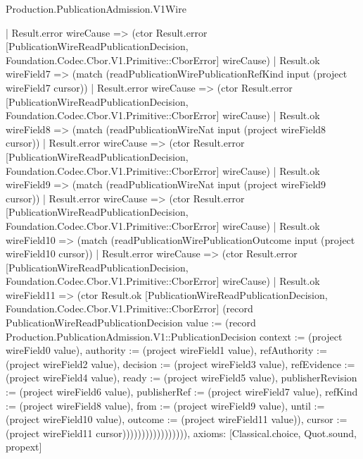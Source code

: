 \begin{lexlean}{Production.PublicationAdmission.V1Wire}
\begin{semanticmodule}
{                      | Result.error wireCause => (ctor Result.error [PublicationWireReadPublicationDecision, Foundation.Codec.Cbor.V1.Primitive::CborError] wireCause)
                      | Result.ok wireField7 => (match (readPublicationWirePublicationRefKind input (project wireField7 cursor))
                        | Result.error wireCause => (ctor Result.error [PublicationWireReadPublicationDecision, Foundation.Codec.Cbor.V1.Primitive::CborError] wireCause)
                        | Result.ok wireField8 => (match (readPublicationWireNat input (project wireField8 cursor))
                          | Result.error wireCause => (ctor Result.error [PublicationWireReadPublicationDecision, Foundation.Codec.Cbor.V1.Primitive::CborError] wireCause)
                          | Result.ok wireField9 => (match (readPublicationWireNat input (project wireField9 cursor))
                            | Result.error wireCause => (ctor Result.error [PublicationWireReadPublicationDecision, Foundation.Codec.Cbor.V1.Primitive::CborError] wireCause)
                            | Result.ok wireField10 => (match (readPublicationWirePublicationOutcome input (project wireField10 cursor))
                              | Result.error wireCause => (ctor Result.error [PublicationWireReadPublicationDecision, Foundation.Codec.Cbor.V1.Primitive::CborError] wireCause)
                              | Result.ok wireField11 => (ctor Result.ok [PublicationWireReadPublicationDecision, Foundation.Codec.Cbor.V1.Primitive::CborError] (record PublicationWireReadPublicationDecision {value := (record Production.PublicationAdmission.V1::PublicationDecision {context := (project wireField0 value), authority := (project wireField1 value), refAuthority := (project wireField2 value), decision := (project wireField3 value), refEvidence := (project wireField4 value), ready := (project wireField5 value), publisherRevision := (project wireField6 value), publisherRef := (project wireField7 value), refKind := (project wireField8 value), from := (project wireField9 value), until := (project wireField10 value), outcome := (project wireField11 value)}), cursor := (project wireField11 cursor)})))))))))))))))),
  axioms: [Classical.choice, Quot.sound, propext]
}


\end{semanticmodule}
\end{lexlean}
